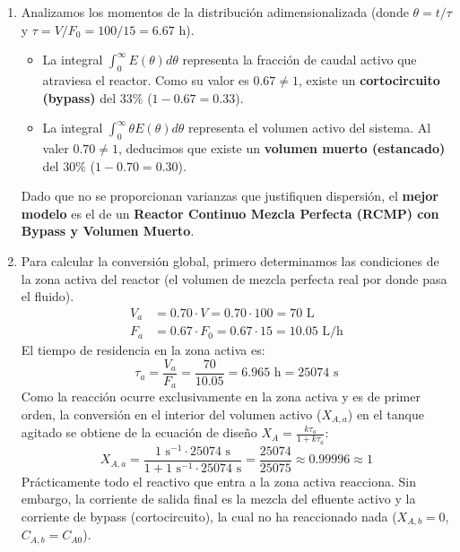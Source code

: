 \begin{enumerate}[label=\alph*)]
	\item Analizamos los momentos de la distribución adimensionalizada (donde $\theta = t/\tau$ y $\tau = V/F_0 = 100/15 = 6.67\text{ h}$).
	      \begin{itemize}
		      \item La integral $\int_0^\infty E(\theta) d\theta$ representa la fracción de caudal activo que atraviesa el reactor. Como su valor es $0.67 \neq 1$, existe un \textbf{cortocircuito (bypass)} del $33\%$ ($1 - 0.67 = 0.33$).
		      \item La integral $\int_0^\infty \theta E(\theta) d\theta$ representa el volumen activo del sistema. Al valer $0.70 \neq 1$, deducimos que existe un \textbf{volumen muerto (estancado)} del $30\%$ ($1 - 0.70 = 0.30$).
	      \end{itemize}
	      Dado que no se proporcionan varianzas que justifiquen dispersión, el \textbf{mejor modelo} es el de un \textbf{Reactor Continuo Mezcla Perfecta (RCMP) con Bypass y Volumen Muerto}.

	\item Para calcular la conversión global, primero determinamos las condiciones de la zona activa del reactor (el volumen de mezcla perfecta real por donde pasa el fluido).
	      \begin{align*}
		      V_a & = 0.70 \cdot V = 0.70 \cdot 100 = 70\text{ L}       \\
		      F_a & = 0.67 \cdot F_0 = 0.67 \cdot 15 = 10.05\text{ L/h}
	      \end{align*}
	      El tiempo de residencia en la zona activa es:
	      \begin{equation*}
		      \tau_a = \frac{V_a}{F_a} = \frac{70}{10.05} = 6.965\text{ h} = 25074\text{ s}
	      \end{equation*}
	      Como la reacción ocurre exclusivamente en la zona activa y es de primer orden, la conversión en el interior del volumen activo ($X_{A,a}$) en el tanque agitado se obtiene de la ecuación de diseño $X_A = \frac{k\tau_a}{1+k\tau_a}$:
	      \begin{equation*}
		      X_{A,a} = \frac{1\text{ s}^{-1} \cdot 25074\text{ s}}{1 + 1\text{ s}^{-1} \cdot 25074\text{ s}} = \frac{25074}{25075} \approx 0.99996 \approx 1
	      \end{equation*}
	      Prácticamente todo el reactivo que entra a la zona activa reacciona. Sin embargo, la corriente de salida final es la mezcla del efluente activo y la corriente de bypass (cortocircuito), la cual no ha reaccionado nada ($X_{A,b} = 0$, $C_{A,b} = C_{A0}$).


\end{enumerate}
